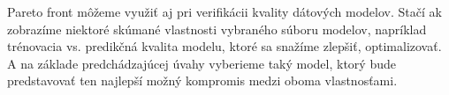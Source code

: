 Pareto front môžeme využiť aj pri verifikácii kvality dátových modelov. Stačí ak zobrazíme niektoré skúmané vlastnosti vybraného súboru modelov, napríklad trénovacia vs. predikčná kvalita modelu, ktoré sa snažíme zlepšiť, optimalizovať. A na základe predchádzajúcej úvahy vyberieme taký model, ktorý bude predstavovať ten najlepší možný kompromis medzi oboma vlastnosťami. 